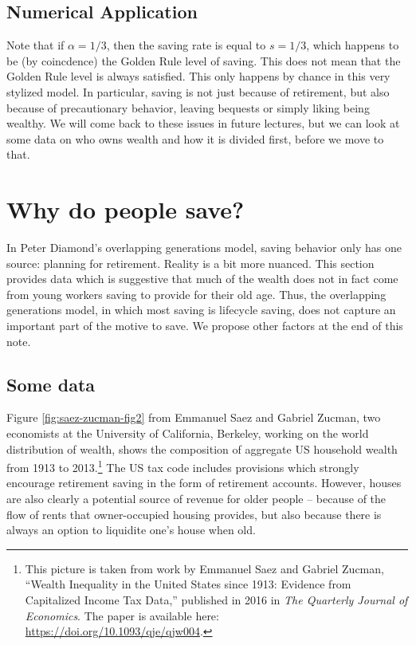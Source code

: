 \documentclass[]{book}
\let\rmarkdownfootnote\footnote%
\def\footnote{\protect\rmarkdownfootnote}
\theoremstyle{definition}
\theoremstyle{definition}
\theoremstyle{definition}
\theoremstyle{remark}
\begin{document}
\subsection{Numerical Application}\label{numerical-application}

Note that if \(\alpha=1/3\), then the saving rate is equal to
\(s = 1/3\), which happens to be (by coincdence) the Golden Rule level
of saving. This does not mean that the Golden Rule level is always
satisfied. This only happens by chance in this very stylized model. In
particular, saving is not just because of retirement, but also because
of precautionary behavior, leaving bequests or simply liking being
wealthy. We will come back to these issues in future lectures, but we
can look at some data on who owns wealth and how it is divided first,
before we move to that.

\section{Why do people save?}\label{why-do-people-save-olg}

In Peter Diamond's overlapping generations model, saving behavior only
has one source: planning for retirement. Reality is a bit more nuanced.
This section provides data which is suggestive that much of the wealth
does not in fact come from young workers saving to provide for their old
age. Thus, the overlapping generations model, in which most saving is
lifecycle saving, does not capture an important part of the motive to
save. We propose other factors at the end of this note.

\subsection{Some data}\label{some-data-1}

Figure \ref{fig:saez-zucman-fig2} from Emmanuel Saez and Gabriel Zucman,
two economists at the University of California, Berkeley, working on the
world distribution of wealth, shows the composition of aggregate US
household wealth from 1913 to 2013.\footnote{This picture is taken from
  work by Emmanuel Saez and Gabriel Zucman, ``Wealth Inequality in the
  United States since 1913: Evidence from Capitalized Income Tax Data,''
  published in 2016 in \emph{The Quarterly Journal of Economics}. The
  paper is available here: \url{https://doi.org/10.1093/qje/qjw004}.}
The US tax code includes provisions which strongly encourage retirement
saving in the form of retirement accounts. However, houses are also
clearly a potential source of revenue for older people -- because of the
flow of rents that owner-occupied housing provides, but also because
there is always an option to liquidite one's house when old.
\end{document}
